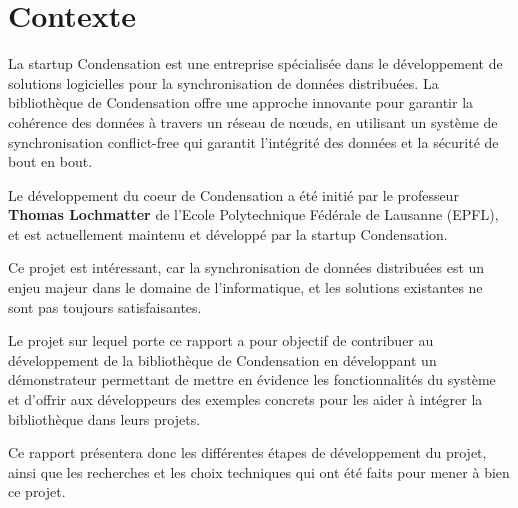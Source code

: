 \section{Contexte}
La startup Condensation est une entreprise spécialisée dans le développement de solutions logicielles pour la synchronisation de données distribuées. La bibliothèque de Condensation offre une approche innovante pour garantir la cohérence des données à travers un réseau de n\oe uds, en utilisant un système de synchronisation conflict-free qui garantit l'intégrité des données et la sécurité de bout en bout.

Le développement du coeur de Condensation a été initié par le professeur \textbf{Thomas Lochmatter} de l'Ecole Polytechnique Fédérale de Lausanne (EPFL), et est actuellement maintenu et développé par la startup Condensation.

Ce projet est intéressant, car la synchronisation de données distribuées est un enjeu majeur dans le domaine de l'informatique, et les solutions existantes ne sont pas toujours satisfaisantes.

Le projet sur lequel porte ce rapport a pour objectif de contribuer au développement de la bibliothèque de Condensation en développant un démonstrateur permettant de mettre en évidence les fonctionnalités du système et d'offrir aux développeurs des exemples concrets pour les aider à intégrer la bibliothèque dans leurs projets.

Ce rapport présentera donc les différentes étapes de développement du projet, ainsi que les recherches et les choix techniques qui ont été faits pour mener à bien ce projet.